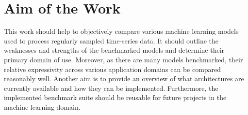 \documentclass[draft,final]{vutinfth} %
\begin{document}
    \section{Aim of the Work}
    This work should help to objectively compare various machine learning models used to process regularly sampled time-series data.
    It should outline the weaknesses and strengths of the benchmarked models and determine their primary domain of use.
    Moreover, as there are many models benchmarked, their relative expressivity across various application domains can be compared reasonably well.
    Another aim is to provide an overview of what architectures are currently available and how they can be implemented.
    Furthermore, the implemented benchmark suite should be reusable for future projects in the machine learning domain.
\end{document}
